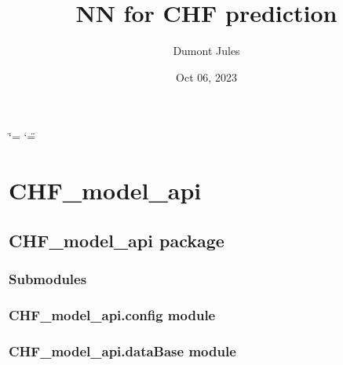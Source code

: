 \documentclass[letterpaper,10pt,english]{sphinxmanual}
\title{NN for CHF prediction}
\date{Oct 06, 2023}
\author{Dumont Jules}
\begin{document}
\ifdefined\shorthandoff
  \ifnum\catcode`\=\string=\active\shorthandoff{=}\fi
  \ifnum\catcode`\"=\active{}\fi
\fi

\pagestyle{empty}
\sphinxmaketitle
\pagestyle{plain}
\sphinxtableofcontents
\pagestyle{normal}
\label{\detokenize{index::doc}}


\sphinxstepscope


\chapter{CHF\_model\_api}
\label{\detokenize{modules:chf-model-api}}\label{\detokenize{modules::doc}}
\sphinxstepscope


\section{CHF\_model\_api package}
\label{\detokenize{CHF_model_api:chf-model-api-package}}\label{\detokenize{CHF_model_api::doc}}

\subsection{Submodules}
\label{\detokenize{CHF_model_api:submodules}}

\subsection{CHF\_model\_api.config module}
\label{\detokenize{CHF_model_api:module-CHF_model_api.config}}\label{\detokenize{CHF_model_api:chf-model-api-config-module}}

\subsection{CHF\_model\_api.dataBase module}
\label{\detokenize{CHF_model_api:module-CHF_model_api.dataBase}}\label{\detokenize{CHF_model_api:chf-model-api-database-module}}
\end{document}
